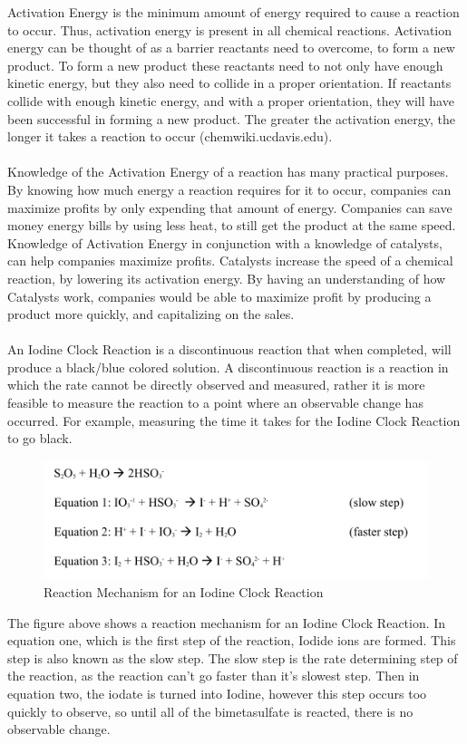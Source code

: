 \documentclass{article}
\begin{document}
\noindent
Activation Energy is the minimum amount of energy required to cause a reaction to occur. Thus, activation energy is present in all chemical reactions. Activation energy can be thought of as a barrier reactants need to overcome, to form a new product. To form a new product these reactants need to not only have enough kinetic energy, but they also need to collide in a proper orientation. If reactants collide with enough kinetic energy, and with a proper orientation, they will have been successful in forming a new product. The greater the activation energy, the longer it takes a reaction to occur (chemwiki.ucdavis.edu). \\\\
Knowledge of the Activation Energy of a reaction has many practical purposes. By knowing how much energy a reaction requires for it to occur, companies can maximize profits by only expending that amount of energy. Companies can save money energy bills by using less heat, to still get the product at the same speed. Knowledge of Activation Energy in conjunction with a knowledge of catalysts, can help companies maximize profits. Catalysts increase the speed of a chemical reaction, by lowering its activation energy. By having an understanding of how Catalysts work, companies would be able to maximize profit by producing a product more quickly, and capitalizing on the sales. \\\\
An Iodine Clock Reaction is a discontinuous reaction that when completed, will produce a black/blue colored solution. A discontinuous reaction is a reaction in which the rate cannot be directly observed and measured, rather it is more feasible to measure the reaction to a point where an observable change has occurred. For example, measuring the time it takes for the Iodine Clock Reaction to go black. \\
\begin{figure}[H]
	\centering
	\includegraphics{2.png}
	\caption{Reaction Mechanism for an Iodine Clock Reaction}
\end{figure}
\noindent
The figure above shows a reaction mechanism for an Iodine Clock Reaction. In equation one, which is the first step of the reaction, Iodide ions are formed. This step is also known as the slow step. The slow step is the rate determining step of the reaction, as the reaction can't go faster than it's slowest step. Then in equation two, the iodate is turned into Iodine, however this step occurs too quickly to observe, so until all of the bimetasulfate is reacted, there is no observable change. \\\\
\end{document}
